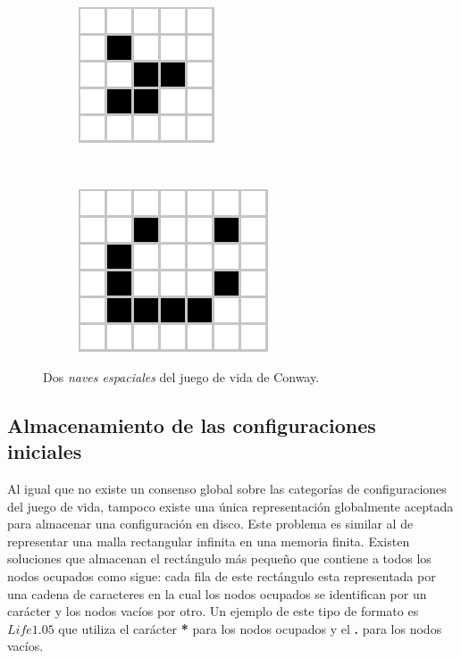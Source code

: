 \documentclass[../proyecto.tex]{memoir}
\begin{document}
\begin{figure}[H]
	\centering
	\begin{subfigure}[b]{0.3\linewidth} 
        \centering
        \includegraphics[height=.45\linewidth]{./images/glider.png}
        \caption{}
        \label{fig:glider}
    \end{subfigure}
    \ 
	\begin{subfigure}[b]{0.3\linewidth} 
        \centering
        \includegraphics[height=0.45\linewidth]{./images/lightweightspaceship.png}
        \caption{}
        \label{fig:lightweightspaceship}
    \end{subfigure}
	\caption{Dos \textit{naves espaciales} del juego de vida de Conway.}
	\label{fig:congIniciales4}
\end{figure} 

\subsection{Almacenamiento de las configuraciones iniciales} \label{rle}

Al igual que no existe un consenso global sobre las categorías de configuraciones del juego de vida, tampoco existe una única representación globalmente aceptada para almacenar una configuración en disco. Este problema es similar al de representar una malla rectangular infinita en una memoria finita. Existen soluciones que almacenan el rectángulo más pequeño que contiene a todos los nodos ocupados como sigue: cada fila de este rectángulo esta representada por una cadena de caracteres en la cual los nodos ocupados se identifican por un carácter y los nodos vacíos por otro. Un ejemplo de este tipo de formato es $Life 1.05$ que utiliza el carácter \textbf{*} para los nodos ocupados y el \textbf{.} para los nodos vacíos. 
\end{document}
